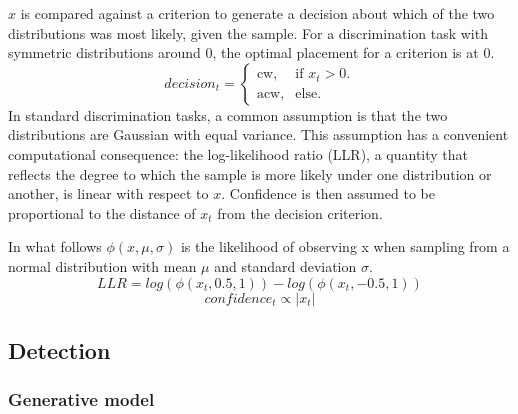 \documentclass[12pt,twoside]{reedthesis}
\begin{document}
\(x\) is compared against a criterion to generate a decision about which of the two distributions was most likely, given the sample. For a discrimination task with symmetric distributions around 0, the optimal placement for a criterion is at 0.
\begin{equation}
  decision_t=\begin{cases}
    \text{cw}, & \text{if } x_t>0.\\
   \text{acw}, & \text{else}.
    
  \end{cases}
\end{equation}
In standard discrimination tasks, a common assumption is that the two distributions are Gaussian with equal variance. This assumption has a convenient computational consequence: the log-likelihood ratio (LLR), a quantity that reflects the degree to which the sample is more likely under one distribution or another, is linear with respect to \(x\). Confidence is then assumed to be proportional to the distance of \(x_t\) from the decision criterion.

In what follows \(\phi(x,\mu,\sigma)\) is the likelihood of observing x when sampling from a normal distribution with mean \(\mu\) and standard deviation \(\sigma\).
\begin{equation}
LLR = log(\phi(x_t,0.5,1))-log(\phi(x_t,-0.5,1))
\end{equation}
\begin{equation}
confidence_t \propto |x_t|
\end{equation}
\hypertarget{detection-2}{%
\subsection{Detection}\label{detection-2}}

\hypertarget{generative-model-3}{%
\subsubsection*{Generative model}\label{generative-model-3}}
\end{document}
